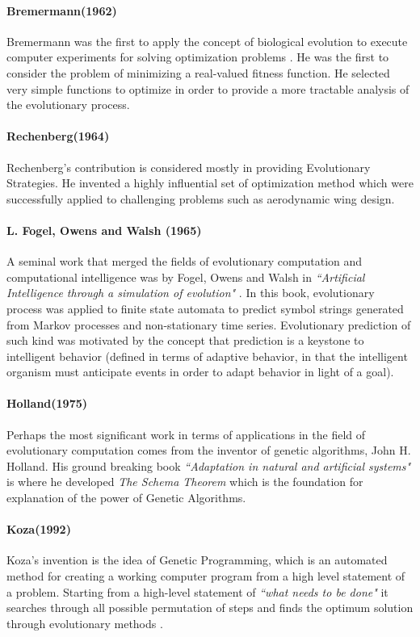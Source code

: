 \paragraph{Bremermann(1962)}
Bremermann was the first to apply the concept of biological evolution to execute computer experiments for solving optimization problems \cite{bremermann1962}. He was the first to consider the problem of minimizing a real-valued fitness function. He selected very simple functions to optimize in order to provide a more tractable analysis of the evolutionary process.

\paragraph{Rechenberg(1964)}
Rechenberg's contribution is considered mostly in providing Evolutionary Strategies. He invented a highly influential set of optimization method which were successfully applied to challenging problems such as aerodynamic wing design. \cite{rechenberg1973}

\paragraph{L. Fogel, Owens and Walsh (1965)}
A seminal work that merged the fields of evolutionary computation and computational intelligence was by Fogel, Owens and Walsh in \textsl{``Artificial Intelligence through a simulation of evolution"} \cite{fogel1966}. In this book, evolutionary process was applied to finite state automata to predict symbol strings generated from Markov processes and non-stationary time series. Evolutionary prediction of such kind was motivated by the concept that prediction is a keystone to intelligent behavior (defined in terms of adaptive behavior, in that the intelligent organism must anticipate events in order to adapt behavior in light of a goal). 

\paragraph{Holland(1975)}
Perhaps the most significant work in terms of applications in the field of evolutionary computation comes from the inventor of genetic algorithms, John H. Holland. His ground breaking book \textsl{``Adaptation in natural and artificial systems"} \cite{holland1975} is where he developed \textit{The Schema Theorem} which is the foundation for explanation of the power of Genetic Algorithms.

\paragraph{Koza(1992)}
Koza's invention is the idea of Genetic Programming, which is an automated method for creating a working computer program from a high level statement of a problem. Starting from a high-level statement of \textsl{``what needs to be done"} it searches through all possible permutation of steps and finds the optimum solution through evolutionary methods \cite{koza1992}.

